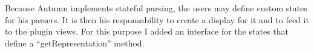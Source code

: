 	Because Autumn implements stateful parsing, the users may define custom states for his parsers. It is then his responsability to create a display for it and to feed it to the plugin views. For this purpose I added an interface for the states that define a ``getRepresentation'' method.


